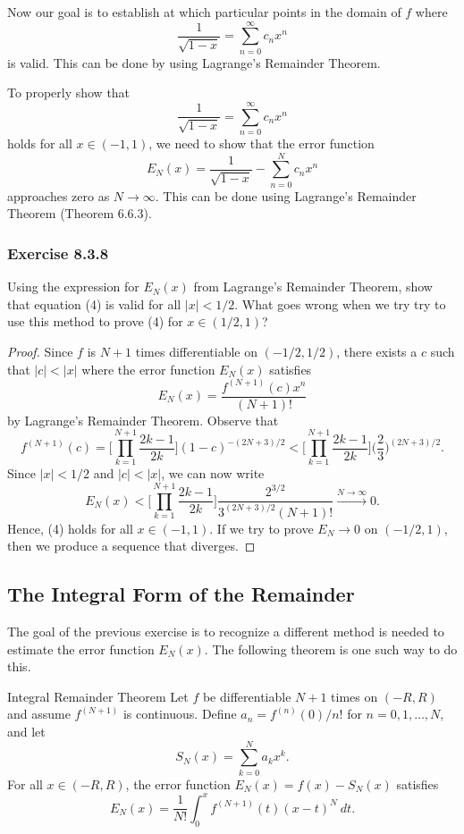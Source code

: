 Now our goal is to establish at which particular points in the domain of \( f  \) where 
\[  \frac{ 1 }{ \sqrt{ 1- x  }  }  = \sum_{ n=0 }^{ \infty  } c_{n} x^{n} \tag{4}  \] is valid. This can be done by using Lagrange's Remainder Theorem. 

To properly show that 
\[  \frac{ 1 }{ \sqrt{ 1-x  }  }  = \sum_{ n=0  }^{ \infty  } c_{n} x^{n}  \]
holds for all \( x \in (-1,1)  \), we need to show that the error function 
\[  E_{N}(x) = \frac{ 1 }{ \sqrt{ 1- x  }  }  - \sum_{ n=0  }^{ N  } c_{n } x^{ n} \]
approaches zero as \( N \to \infty  \). This can be done using Lagrange's Remainder Theorem (Theorem 6.6.3).


\subsubsection{Exercise 8.3.8} Using the expression for \( E_{N}(x)  \) from Lagrange's Remainder Theorem, show that equation (4) is valid for all \( | x  |  < 1 / 2  \). What goes wrong when we try try to use this method to prove (4) for \( x \in (1/2, 1 ) \)?
\begin{proof}
Since \( f  \) is \( N+1  \) times differentiable on \( (-1/2 , 1/ 2 ) \), there exists a \( c  \) such that \( |  c  |  < | x  |  \) where the error function \( E_{N}(x)  \) satisfies 
\[  E_{N}(x) = \frac{ f^{(N+1)}(c)  x^{n }  }{ (N+1)! } \] by Lagrange's Remainder Theorem. 
Observe that 
\[  f^{(N+1)}(c) = \Big[ \prod_{k=1}^{N+1} \frac{ 2k-1  }{ 2k }  \Big]   (1 -c )^{-(2N+3)/2} < \Big[ \prod_{k=1}^{N+1} \frac{ 2k-1  }{ 2k }  \Big]\Big( \frac{ 2 }{ 3 }  \Big)^{ (2N+3)/ 2}.\]
Since \( | x  |  < 1/ 2  \) and \( |  c  | < | x  |  \), we can now write
\[ E_{N}(x) < \Big[ \prod_{k=1}^{N+1} \frac{ 2k-1  }{ 2k }  \Big]\frac{  2^{3/2}}{  3^{(2N+3)/2} (N+1)! } \xrightarrow{N\rightarrow\infty} 0.   \]
Hence, (4) holds for all \( x \in (-1,1) \). If we try to prove \( E_{N} \to 0  \) on \( (-1/2 , 1 ) \), then we produce a sequence that diverges.
\end{proof}
\subsection{The Integral Form of the Remainder}

The goal of the previous exercise is to recognize a different method is needed to estimate the error function \( E_{N}(x)   \). The following theorem is one such way to do this.

\begin{theorem}{Integral Remainder Theorem}{}
    Let \( f  \) be differentiable \( N+1  \) times on \( (-R,R ) \) and assume \( f^{(N+1)}  \) is continuous. Define \( a_{n} = f^{(n)} (0) / n !   \) for \( n = 0,1 , \dots , N  \), and let 
    \[  S_{N}(x) = \sum_{ k=0 }^{ N   } a_{k } x^{k }.  \] For all \( x \in (-R ,R ) \), the error function \( E_{N}(x) = f(x) - S_{N}(x)   \) satisfies 
    \[  E_{N}(x) = \frac{ 1 }{ N! } \int_{ 0 }^{ x  }  f^{(N+1) }(t) (x-t)^{N} \  dt.  \]
    \end{theorem}

